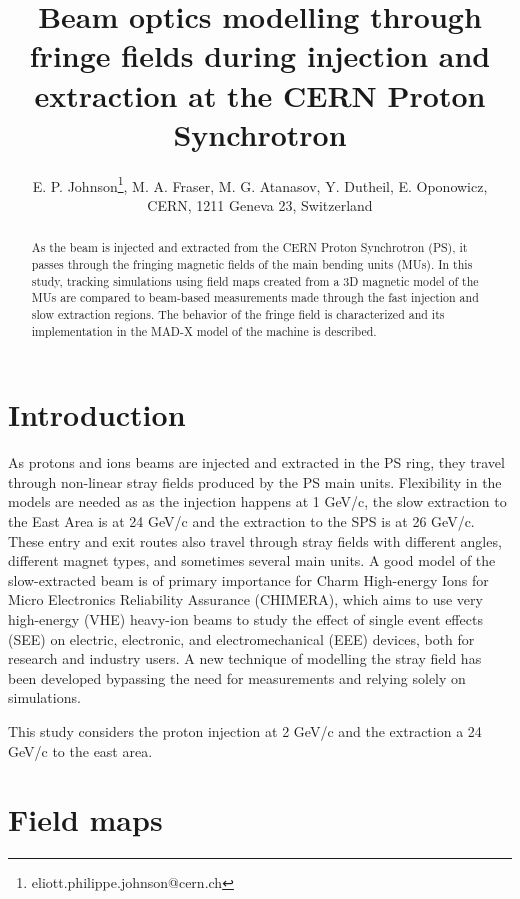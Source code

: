 \documentclass[a4paper,
               biblatex,     %
               keeplastbox,   %
               ]{jacow}
\begin{document}
\title{Beam optics modelling through fringe fields during injection and extraction at the CERN Proton Synchrotron}

\author{E. P. Johnson\thanks{eliott.philippe.johnson@cern.ch}, M. A. Fraser, M. G. Atanasov, Y. Dutheil, E. Oponowicz,\\ CERN, 1211 Geneva 23, Switzerland}
	
\maketitle

%
\begin{abstract}
As the beam is injected and extracted from the CERN Proton Synchrotron (PS), it passes through the fringing magnetic fields of the main bending units (MUs). In this study, tracking simulations using field maps created from a 3D magnetic model of the MUs are compared to beam-based measurements made through the fast injection and slow extraction regions. The behavior of the fringe field is characterized and its implementation in the MAD-X model of the machine is described.
\end{abstract}


\section{Introduction}
As protons and ions beams are injected and extracted in the PS ring, they travel through non-linear stray fields produced by the PS main units. Flexibility in the models are needed as as the injection happens at 1 GeV/c, the slow extraction to the East Area is at 24 GeV/c and the extraction to the SPS is at 26 GeV/c. These entry and exit routes also travel through stray fields with different angles, different magnet types, and sometimes several main units. A good model of the slow-extracted beam is of primary importance for Charm High-energy Ions for
Micro Electronics Reliability Assurance (CHIMERA), which aims to use very high-energy (VHE) heavy-ion beams to study the effect of single event effects (SEE) on electric, electronic, and electromechanical (EEE) devices, both for research and industry users. A new technique of modelling the stray field has been developed bypassing the need for measurements and relying solely on simulations.

This study considers the proton injection at 2 GeV/c and the extraction a 24 GeV/c to the east area.

\section{Field maps}
\end{document}
